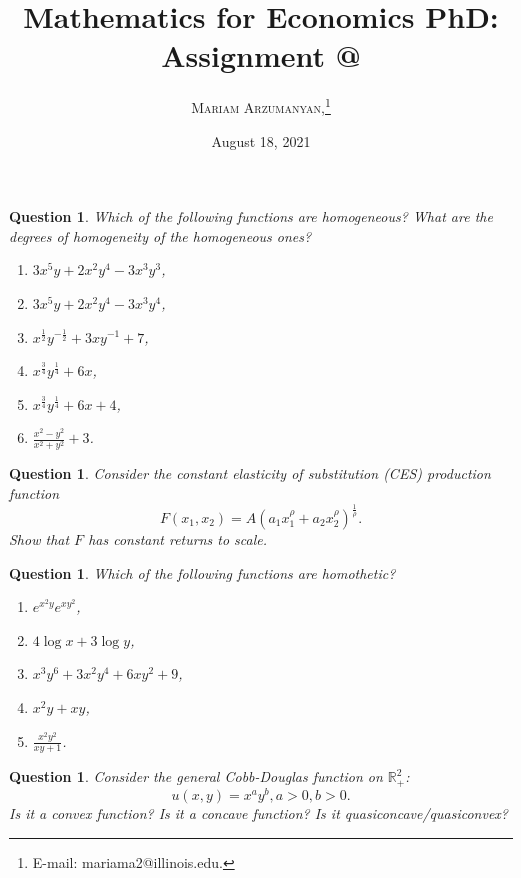 \documentclass[12pt]{article}
\makeatletter
\newtheorem{ques}[theorem]{Question}
\newcommand*{\rom}[1]{\expandafter\@slowromancap\romannumeral #1@}
\makeatother
\begin{document}
\setcounter{footnote}{0}
\title{Mathematics for Economics PhD: Assignment \rom{3}}
\author{\textsc{Mariam Arzumanyan,}\thanks {   E-mail: mariama2@illinois.edu.} \\ } 


\date{August 18, 2021}


\maketitle 


\begin{ques}
Which of the following functions are homogeneous? What are the degrees of homogeneity of the homogeneous ones?
\begin{enumerate}
    \item $3x^5y+2x^2y^4-3x^3y^3$,
    \item $3x^5y+2x^2y^4-3x^3y^4$,
    \item $x^{\frac{1}{2}}y^{-\frac{1}{2}}+3xy^{-1}+7$,
    \item $x^{\frac{3}{4}}y^{\frac{1}{4}}+6x$,
    \item $x^{\frac{3}{4}}y^{\frac{1}{4}}+6x+4$,
    \item $\frac{x^2-y^2}{x^2+y^2}+3$.
\end{enumerate}
\end{ques}

\newpage
\begin{ques}
Consider the constant elasticity of substitution (CES) production function
\[F(x_1, x_2)=A(a_1x_1^\rho+a_2x_2^\rho)^\frac{1}{\rho}.
\]
Show that $F$ has constant returns to scale. 
\end{ques}

\newpage
\begin{ques}
Which of the following functions are homothetic?
\begin{enumerate}
    \item $e^{x^2y}e^{xy^2}$,
    \item $4 \log x +3\log y$,
    \item $x^3y^6+3x^2y^4+6xy^2+9$,
    \item $x^2y+xy$,
    \item $\frac{x^2y^2}{xy+1}$.
\end{enumerate}
\end{ques}



\newpage
\begin{ques}
Consider the general Cobb-Douglas function on $\mathbb{R}_+^2$: 
\[u(x,y)=x^ay^b, a>0, b>0.
\]
Is it a convex function? Is it a concave function? Is  it quasiconcave/quasiconvex?

\end{ques}
\end{document}
